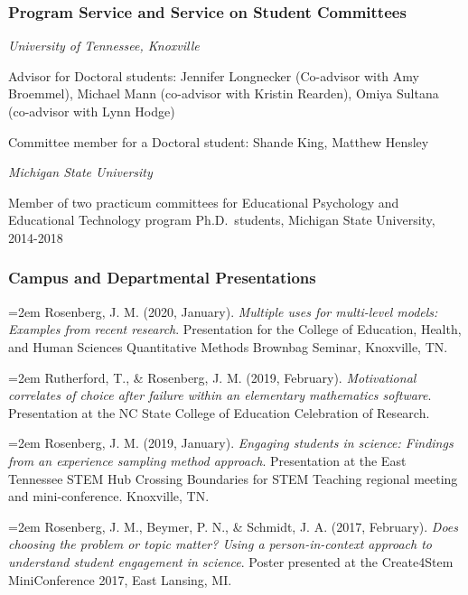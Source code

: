\documentclass[
  11pt,
]{article}
\begin{document}
\hypertarget{program-service-and-service-on-student-committees}{%
\subsubsection{Program Service and Service on Student
Committees}\label{program-service-and-service-on-student-committees}}

\emph{University of Tennessee, Knoxville}

Advisor for Doctoral students: Jennifer Longnecker (Co-advisor with Amy
Broemmel), Michael Mann (co-advisor with Kristin Rearden), Omiya Sultana
(co-advisor with Lynn Hodge)

Committee member for a Doctoral student: Shande King, Matthew Hensley

\emph{Michigan State University}

Member of two practicum committees for Educational Psychology and
Educational Technology program Ph.D.~students, Michigan State
University, 2014-2018

\hypertarget{campus-and-departmental-presentations}{%
\subsubsection{Campus and Departmental
Presentations}\label{campus-and-departmental-presentations}}

\hangindent=2em Rosenberg, J. M. (2020, January). \emph{Multiple uses
for multi-level models: Examples from recent research}. Presentation for
the College of Education, Health, and Human Sciences Quantitative
Methods Brownbag Seminar, Knoxville, TN.

\hangindent=2em Rutherford, T., \& Rosenberg, J. M. (2019, February).
\emph{Motivational correlates of choice after failure within an
elementary mathematics software}. Presentation at the NC State College
of Education Celebration of Research.

\hangindent=2em Rosenberg, J. M. (2019, January). \emph{Engaging
students in science: Findings from an experience sampling method
approach}. Presentation at the East Tennessee STEM Hub Crossing
Boundaries for STEM Teaching regional meeting and mini-conference.
Knoxville, TN.

\hangindent=2em Rosenberg, J. M., Beymer, P. N., \& Schmidt, J. A.
(2017, February). \emph{Does choosing the problem or topic matter? Using
a person-in-context approach to understand student engagement in
science}. Poster presented at the Create4Stem MiniConference 2017, East
Lansing, MI.
\end{document}
